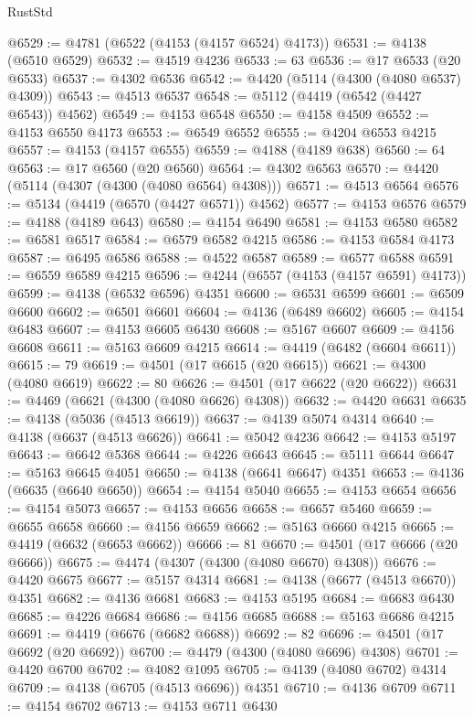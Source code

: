 \begin{lexlean}{RustStd}
\begin{coremodule}
@6529 := @4781 (@6522 (@4153 (@4157 @6524) @4173))
@6531 := @4138 (@6510 @6529)
@6532 := @4519 @4236
@6533 := 63
@6536 := @17 @6533 (@20 @6533)
@6537 := @4302 @6536
@6542 := @4420 (@5114 (@4300 (@4080 @6537) @4309))
@6543 := @4513 @6537
@6548 := @5112 (@4419 (@6542 (@4427 @6543)) @4562)
@6549 := @4153 @6548
@6550 := @4158 @4509
@6552 := @4153 @6550 @4173
@6553 := @6549 @6552
@6555 := @4204 @6553 @4215
@6557 := @4153 (@4157 @6555)
@6559 := @4188 (@4189 @638)
@6560 := 64
@6563 := @17 @6560 (@20 @6560)
@6564 := @4302 @6563
@6570 := @4420 (@5114 (@4307 (@4300 (@4080 @6564) @4308)))
@6571 := @4513 @6564
@6576 := @5134 (@4419 (@6570 (@4427 @6571)) @4562)
@6577 := @4153 @6576
@6579 := @4188 (@4189 @643)
@6580 := @4154 @6490
@6581 := @4153 @6580
@6582 := @6581 @6517
@6584 := @6579 @6582 @4215
@6586 := @4153 @6584 @4173
@6587 := @6495 @6586
@6588 := @4522 @6587
@6589 := @6577 @6588
@6591 := @6559 @6589 @4215
@6596 := @4244 (@6557 (@4153 (@4157 @6591) @4173))
@6599 := @4138 (@6532 @6596) @4351
@6600 := @6531 @6599
@6601 := @6509 @6600
@6602 := @6501 @6601
@6604 := @4136 (@6489 @6602)
@6605 := @4154 @6483
@6607 := @4153 @6605 @6430
@6608 := @5167 @6607
@6609 := @4156 @6608
@6611 := @5163 @6609 @4215
@6614 := @4419 (@6482 (@6604 @6611))
@6615 := 79
@6619 := @4501 (@17 @6615 (@20 @6615))
@6621 := @4300 (@4080 @6619)
@6622 := 80
@6626 := @4501 (@17 @6622 (@20 @6622))
@6631 := @4469 (@6621 (@4300 (@4080 @6626) @4308))
@6632 := @4420 @6631
@6635 := @4138 (@5036 (@4513 @6619))
@6637 := @4139 @5074 @4314
@6640 := @4138 (@6637 (@4513 @6626))
@6641 := @5042 @4236
@6642 := @4153 @5197
@6643 := @6642 @5368
@6644 := @4226 @6643
@6645 := @5111 @6644
@6647 := @5163 @6645 @4051
@6650 := @4138 (@6641 @6647) @4351
@6653 := @4136 (@6635 (@6640 @6650))
@6654 := @4154 @5040
@6655 := @4153 @6654
@6656 := @4154 @5073
@6657 := @4153 @6656
@6658 := @6657 @5460
@6659 := @6655 @6658
@6660 := @4156 @6659
@6662 := @5163 @6660 @4215
@6665 := @4419 (@6632 (@6653 @6662))
@6666 := 81
@6670 := @4501 (@17 @6666 (@20 @6666))
@6675 := @4474 (@4307 (@4300 (@4080 @6670) @4308))
@6676 := @4420 @6675
@6677 := @5157 @4314
@6681 := @4138 (@6677 (@4513 @6670)) @4351
@6682 := @4136 @6681
@6683 := @4153 @5195
@6684 := @6683 @6430
@6685 := @4226 @6684
@6686 := @4156 @6685
@6688 := @5163 @6686 @4215
@6691 := @4419 (@6676 (@6682 @6688))
@6692 := 82
@6696 := @4501 (@17 @6692 (@20 @6692))
@6700 := @4479 (@4300 (@4080 @6696) @4308)
@6701 := @4420 @6700
@6702 := @4082 @1095
@6705 := @4139 (@4080 @6702) @4314
@6709 := @4138 (@6705 (@4513 @6696)) @4351
@6710 := @4136 @6709
@6711 := @4154 @6702
@6713 := @4153 @6711 @6430

\end{coremodule}
\end{lexlean}
